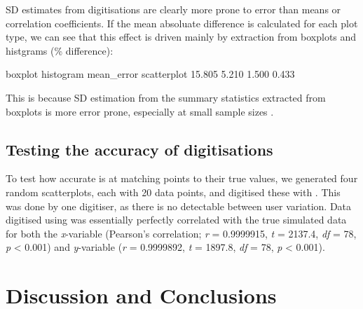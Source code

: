 \documentclass[article]{jss}
\newcommand{\fct}[1]{\code{#1()}}
\begin{document}
SD estimates from digitisations are clearly more prone to error than means or correlation coefficients. If the mean absoluate difference is calculated for each plot type, we can see that this effect is driven mainly by extraction from boxplots and histgrams (\% difference):
\begin{CodeOutput}
    boxplot   histogram  mean_error scatterplot 
     15.805       5.210       1.500       0.433 
\end{CodeOutput}
 This is because SD estimation from the summary statistics extracted from boxplots is more error prone, especially at small sample sizes \citep{Wan2014}.

\subsection{Testing the accuracy of digitisations}
To test how accurate  is at matching points to their true values, we generated four random scatterplots, each with 20 data points, and digitised these with \fct{metaDigitise}. This was done by one digitiser, as there is no detectable between user variation. Data digitised using  was essentially perfectly correlated with the true simulated data for both the \textit{x}-variable (Pearson's correlation; \textit{r} = 0.9999915, \textit{t} = 2137.4, \textit{df} = 78, \textit{p} < 0.001) and \textit{y}-variable (\textit{r} = 0.9999892, \textit{t} = 1897.8, \textit{df} = 78, \textit{p} < 0.001).  

\section{Discussion and Conclusions}
\end{document}

